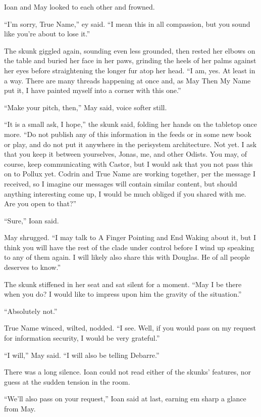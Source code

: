 Ioan and May looked to each other and frowned.

``I'm sorry, True Name,'' ey said. ``I mean this in all compassion, but you sound like you're about to lose it.''

The skunk giggled again, sounding even less grounded, then rested her elbows on the table and buried her face in her paws, grinding the heels of her palms against her eyes before straightening the longer fur atop her head. ``I am, yes. At least in a way. There are many threads happening at once and, as May Then My Name put it, I have painted myself into a corner with this one.''

``Make your pitch, then,'' May said, voice softer still.

``It is a small ask, I hope,'' the skunk said, folding her hands on the tabletop once more. ``Do not publish any of this information in the feeds or in some new book or play, and do not put it anywhere in the perisystem architecture. Not yet. I ask that you keep it between yourselves, Jonas, me, and other Odists. You may, of course, keep communicating with Castor, but I would ask that you not pass this on to Pollux yet. Codrin and True Name are working together, per the message I received, so I imagine our messages will contain similar content, but should anything interesting come up, I would be much obliged if you shared with me. Are you open to that?''

``Sure,'' Ioan said.

May shrugged. ``I may talk to A Finger Pointing and End Waking about it, but I think you will have the rest of the clade under control before I wind up speaking to any of them again. I will likely also share this with Douglas. He of all people deserves to know.''

The skunk stiffened in her seat and sat silent for a moment. ``May I be there when you do? I would like to impress upon him the gravity of the situation.''

``Absolutely not.''

True Name winced, wilted, nodded. ``I see. Well, if you would pass on my request for information security, I would be very grateful.''

``I will,'' May said. ``I will also be telling Debarre.''

There was a long silence. Ioan could not read either of the skunks’ features, nor guess at the sudden tension in the room.

``We'll also pass on your request,'' Ioan said at last, earning em sharp a glance from May.

